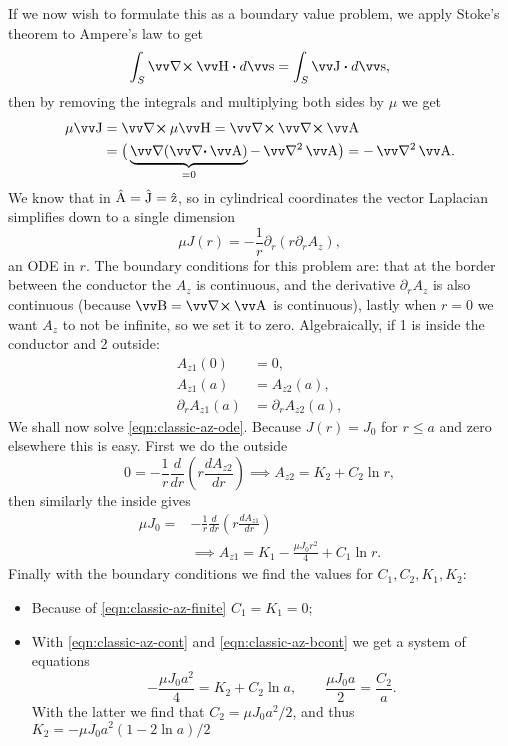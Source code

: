 \documentclass[margin=small]{tex/hsrzf}
\theoremstyle{elmagzf}
\begin{document}
If we now wish to formulate this as a boundary value problem, we apply Stoke's
theorem to Ampere's law to get
\[
  \int_S \curl \vec{H} \dotp d\vec{s} = \int_S \vec{J} \dotp d\vec{s},
\]
then by removing the integrals and multiplying both sides by \(\mu\) we get
\begin{align*}
  \mu \vec{J} &= \curl \mu \vec{H} = \curl \curl \vec{A} \\
    &= \big(
        \underbrace{\grad ( \div \vec{A} )}_{= 0}
        - \vlaplacian \vec{A}
      \big) = -\vlaplacian \vec{A}.
\end{align*}
We know that in \(\hat{\mathrm{A}} = \hat{\mathrm{J}} = \hat{\mathrm{z}}\), so in cylindrical
coordinates the vector Laplacian simplifies down to a single dimension
\begin{equation} \label{eqn:classic-az-ode}
  \mu J(r) = - \frac{1}{r} \partial_r ( r \partial_r A_z ),
\end{equation}
an ODE in \(r\).  The boundary conditions for this problem are: that at the
border between the conductor the \(A_z\) is continuous, and the derivative
\(\partial_r A_z\) is also continuous (because \(\vec{B} = \curl \vec{A}\) is
continuous), lastly when \(r = 0\) we want \(A_z\) to not be infinite, so we set
it to zero.  Algebraically, if 1 is inside the conductor and 2 outside:
\begin{subequations}
  \begin{align}
    A_{z1} (0) &= 0 , \label{eqn:classic-az-finite} \\
    A_{z1} (a) &= A_{z2} (a) , \label{eqn:classic-az-cont} \\
    \partial_r A_{z1} (a) &= \partial_r A_{z2} (a) , \label{eqn:classic-az-bcont}
  \end{align}
\end{subequations}
We shall now solve \eqref{eqn:classic-az-ode}. Because \(J(r) = J_0\) for \(r \leq
a\) and zero elsewhere this is easy. First we do the outside
\[
  0 = -\frac{1}{r} \frac{d}{dr} \left( r \frac{dA_{z2}}{dr} \right)
  \implies A_{z2} = K_2 + C_2 \ln r,
\]
then similarly the inside gives
\begin{align*}
  \mu J_0 = & -\frac{1}{r} \frac{d}{dr} \left( r \frac{dA_{z1}}{dr} \right) \\
  &\implies A_{z1} = K_1 - \frac{\mu J_0 r^2}{4} + C_1 \ln r .
\end{align*}
Finally with the boundary conditions we find the values for \(C_1, C_2, K_1,
K_2\):
\begin{itemize}
  \item Because of \eqref{eqn:classic-az-finite} \(C_1 = K_1 = 0\);
  \item With \eqref{eqn:classic-az-cont} and \eqref{eqn:classic-az-bcont} we get
    a system of equations
    \[
      -\frac{\mu J_0 a^2}{4} = K_2 + C_2 \ln a, \qquad
      \frac{\mu J_0 a}{2} = \frac{C_2}{a}.
    \]
    With the latter we find that \(C_2 = \mu J_0 a^2 / 2\), and thus
    \(K_2 = -\mu J_0 a^2 (1 - 2\ln a) / 2\)
\end{itemize}
\end{document}
